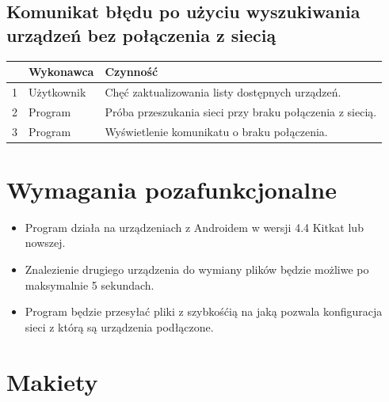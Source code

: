 \documentclass[12pt,a4paper]{article}
\begin{document}
\begin{center}
\subsection{Komunikat błędu po użyciu wyszukiwania urządzeń bez połączenia z siecią}
\begin{tabular}{|l|p{5em}|p{30em}|}
	\hline 
	 & Wykonawca & Czynność \\
	\hline
	1 & Użytkownik & Chęć zaktualizowania listy dostępnych urządzeń. \\
	\hline
	2 & Program & Próba przeszukania sieci przy braku połączenia z siecią. \\
	\hline
	3 & Program & Wyświetlenie komunikatu o braku połączenia. \\
	\hline
\end{tabular}
\end{center}

\section{Wymagania pozafunkcjonalne}

\begin{itemize}
	\item Program działa na urządzeniach z Androidem w wersji 4.4 Kitkat lub nowszej.
	\item Znalezienie drugiego urządzenia do wymiany plików będzie możliwe po maksymalnie 5 sekundach.
	\item Program będzie przesyłać pliki z szybkośćią na jaką pozwala konfiguracja sieci z którą są urządzenia podłączone.
\end{itemize}
\pagebreak
\section{Makiety}
\end{document}
